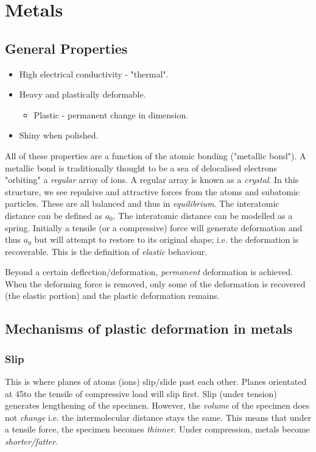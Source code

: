 \documentclass[class=report, crop=false, 12pt,a4paper]{standalone}
\begin{document}
\section{Metals}
\subsection{General Properties}
\begin{itemize}[noitemsep]
  \item High electrical conductivity - "thermal".
  \item Heavy and plastically deformable.
  \begin{itemize}
    \item Plastic - permanent change in dimension.
  \end{itemize}
  \item Shiny when polished.
\end{itemize}
All of these properties are a function of the atomic bonding ("metallic bond"). A metallic bond is traditionally thought to be a sea of delocalised electrons "orbiting" a \emph{regular} array of ions. A regular array is known as a \emph{crystal}. In this structure, we see repulsive and attractive forces from the atoms and subatomic particles. These are all balanced and thus in \emph{equilibrium}. The interatomic distance can be defined as \( a_0 \). The interatomic distance can be modelled as a spring. Initially a tensile (or a compressive) force will generate deformation and thus \( a_0 \) but will attempt to restore to its original shape; i.e. the deformation is recoverable. This is the definition of \emph{elastic} behaviour.

Beyond a certain deflection/deformation, \emph{permanent} deformation is achieved. When the deforming force is removed, only some of the deformation is recovered (the elastic portion) and the plastic deformation remains. 
\subsection{Mechanisms of plastic deformation in metals}
\subsubsection{Slip}
This is where planes of atoms (ions) slip/slide past each other. Planes orientated at 45\degree to the tensile of compressive load will slip first. Slip (under tension) generates lengthening of the specimen. However, the \emph{volume} of the specimen does not \emph{change} i.e. the intermolecular distance stays the same. This means that under a tensile force, the specimen becomes \emph{thinner}. Under compression, metals become \emph{shorter/fatter}.
\end{document}
